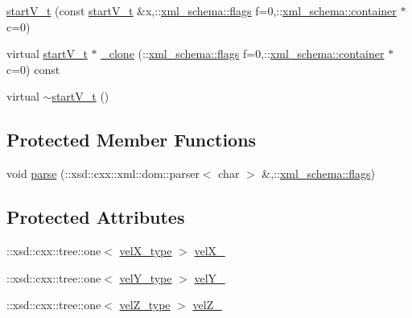 \begin{DoxyCompactItemize}
\item 
\hyperlink{classstartV__t_af6ca7294009d489477fa5d76f15254f3}{start\-V\-\_\-t} (const \hyperlink{classstartV__t}{start\-V\-\_\-t} \&x,\-::\hyperlink{namespacexml__schema_a0612287d030cb2732d31a45b258fdc87}{xml\-\_\-schema\-::flags} f=0,\-::\hyperlink{namespacexml__schema_ada9aa30dc722e93ee2ed7243085402a5}{xml\-\_\-schema\-::container} $\ast$c=0)
\item 
virtual \hyperlink{classstartV__t}{start\-V\-\_\-t} $\ast$ \hyperlink{classstartV__t_aa4a126b38cc99822434689c9ee5bf475}{\-\_\-clone} (\-::\hyperlink{namespacexml__schema_a0612287d030cb2732d31a45b258fdc87}{xml\-\_\-schema\-::flags} f=0,\-::\hyperlink{namespacexml__schema_ada9aa30dc722e93ee2ed7243085402a5}{xml\-\_\-schema\-::container} $\ast$c=0) const 
\item 
virtual \hyperlink{classstartV__t_af4c2e25f679f941f94136709ca0d2152}{$\sim$start\-V\-\_\-t} ()
\end{DoxyCompactItemize}
\subsection*{Protected Member Functions}
\begin{DoxyCompactItemize}
\item 
void \hyperlink{classstartV__t_ad78656f3c8c3d04eb97f6d6796185edc}{parse} (\-::xsd\-::cxx\-::xml\-::dom\-::parser$<$ char $>$ \&,\-::\hyperlink{namespacexml__schema_a0612287d030cb2732d31a45b258fdc87}{xml\-\_\-schema\-::flags})
\end{DoxyCompactItemize}
\subsection*{Protected Attributes}
\begin{DoxyCompactItemize}
\item 
\-::xsd\-::cxx\-::tree\-::one$<$ \hyperlink{classstartV__t_aac8a2d74e6be7ae3248ba26d253ad3fc}{vel\-X\-\_\-type} $>$ \hyperlink{classstartV__t_a0d6673157cfcb402a50d54345e1a8312}{vel\-X\-\_\-}
\item 
\-::xsd\-::cxx\-::tree\-::one$<$ \hyperlink{classstartV__t_acfa8dd01ff687d610335845945099743}{vel\-Y\-\_\-type} $>$ \hyperlink{classstartV__t_ad4eb49113a9009d4834ab3cc2cb3dca3}{vel\-Y\-\_\-}
\item 
\-::xsd\-::cxx\-::tree\-::one$<$ \hyperlink{classstartV__t_ae49f578f0cc0d86f126691188752dfe9}{vel\-Z\-\_\-type} $>$ \hyperlink{classstartV__t_a8069b315d8ad335b23e90f42c94fb3a8}{vel\-Z\-\_\-}
\end{DoxyCompactItemize}


